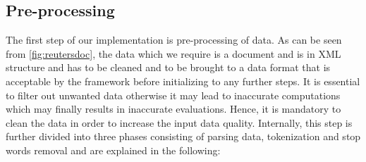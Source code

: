 \subsection{Pre-processing}
\label{section: preprocessing}
The first step of our implementation is pre-processing of data. As can be seen from \ref{fig:reutersdoc}, the data which we require is a document and is in XML structure and has to be cleaned and to be brought to a data format that is acceptable by the framework before initializing to any further steps. It is essential to filter out unwanted data otherwise it may lead to inaccurate computations which may finally results in inaccurate evaluations. Hence, it is mandatory to clean the data in order to increase the input data quality. Internally, this step is further divided into three phases consisting of parsing data, tokenization and stop words removal and are explained in the following:
